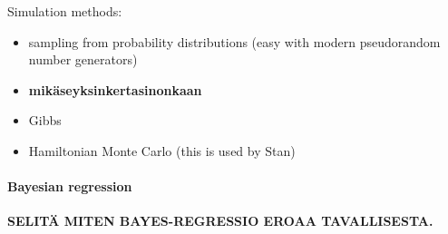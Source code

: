 Simulation methods:
\begin{itemize}
  \item
  sampling from probability distributions (easy with modern pseudorandom
  number generators)
  \item
  \textbf{mikäseyksinkertasinonkaan}
  \item
  Gibbs
  \item
  Hamiltonian Monte Carlo (this is used by Stan)
\end{itemize}


\paragraph{Bayesian regression}\label{bayesian-regression}

\textbf{SELITÄ MITEN BAYES-REGRESSIO EROAA TAVALLISESTA.}
